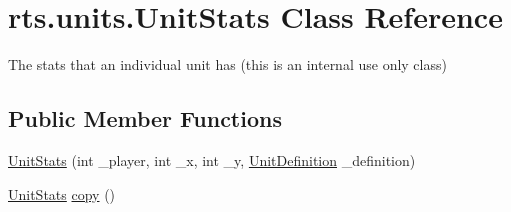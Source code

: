 \hypertarget{classrts_1_1units_1_1_unit_stats}{
\section{rts.units.UnitStats Class Reference}
\label{classrts_1_1units_1_1_unit_stats}
}


The stats that an individual unit has (this is an internal use only class)  


\subsection*{Public Member Functions}
\begin{DoxyCompactItemize}
\item 
\hyperlink{classrts_1_1units_1_1_unit_stats_abb085c05874b1fedf2a1738ffcf3f752}{UnitStats} (int \_\-player, int \_\-x, int \_\-y, \hyperlink{classrts_1_1units_1_1_unit_definition}{UnitDefinition} \_\-definition)
\item 
\hyperlink{classrts_1_1units_1_1_unit_stats}{UnitStats} \hyperlink{classrts_1_1units_1_1_unit_stats_acb97c19e6e09f3827232aef17067d43b}{copy} ()
\end{DoxyCompactItemize}
